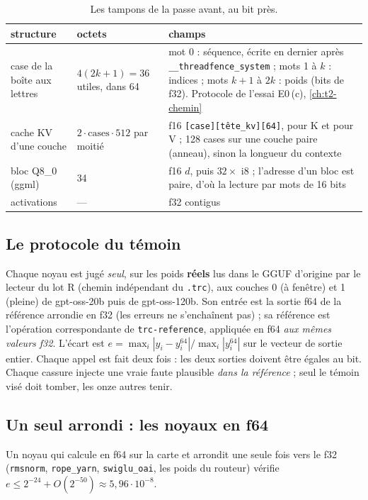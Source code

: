 \begin{table}[!htbp]
\centering\small
\caption[Les tampons de la passe avant]{Les tampons de la passe avant, au bit près.}
\label{tab:t2n-tampons}
\begin{tabularx}{\linewidth}{@{}lp{2.6cm}X@{}}
\toprule
structure & octets & champs \\
\midrule
case de la boîte aux lettres & $4(2k+1) = 36$ utiles, dans 64 & mot 0 : séquence, écrite en dernier après \texttt{\_\_threadfence\_system} ; mots 1 à $k$ : indices ; mots $k+1$ à $2k$ : poids (bits de f32). Protocole de l'essai E0\,(c), \cref{ch:t2-chemin} \\
cache KV d'une couche & $2 \cdot \text{cases} \cdot 512$ par moitié & f16 \texttt{[case][tête\_kv][64]}, pour K et pour V ; 128 cases sur une couche paire (anneau), sinon la longueur du contexte \\
bloc Q8\_0 (ggml) & 34 & f16 $d$, puis $32 \times$ i8 ; l'adresse d'un bloc est paire, d'où la lecture par mots de 16 bits \\
activations & — & f32 contigus \\
\bottomrule
\end{tabularx}
\end{table}

\subsection{Le protocole du témoin}

Chaque noyau est jugé \emph{seul}, sur les poids \textbf{réels} lus dans le GGUF d'origine par le lecteur du lot R (chemin indépendant du \texttt{.trc}), aux couches 0 (à fenêtre) et 1 (pleine) de gpt-oss-20b puis de gpt-oss-120b. Son entrée est la sortie f64 de la référence arrondie en f32 (les erreurs ne s'enchaînent pas) ; sa référence est l'opération correspondante de \texttt{trc-reference}, appliquée en f64 \emph{aux mêmes valeurs f32}. L'écart est $e = \max_i |y_i - y^{64}_i| / \max_i |y^{64}_i|$ sur le vecteur de sortie entier. Chaque appel est fait deux fois : les deux sorties doivent être égales au bit. Chaque cassure injecte une vraie faute plausible \emph{dans la référence} ; seul le témoin visé doit tomber, les onze autres tenir.

\subsection{Un seul arrondi : les noyaux en f64}

\begin{proposition}\label{prop:t2n-un-arrondi}
Un noyau qui calcule en f64 sur la carte et arrondit une seule fois vers le f32 (\texttt{rmsnorm}, \texttt{rope\_yarn}, \texttt{swiglu\_oai}, les poids du routeur) vérifie $e \le 2^{-24} + O(2^{-50}) \approx 5{,}96\cdot10^{-8}$.
\end{proposition}

